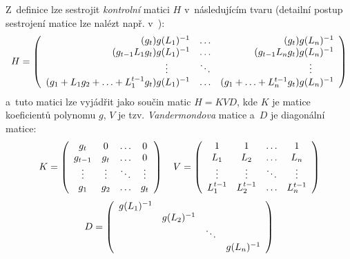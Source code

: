 \documentclass[thesis=M,czech,hidelinks]{FITthesis}[2012/06/26]
\newcommand{\0}{{\textcolor[gray]{0.75}{0}}}
\begin{document}
Z~definice lze sestrojit \emph{kontrolní} matici $H$ v~následujícím tvaru
(detailní postup sestrojení matice lze nalézt např. v~\cite{Kotil}):
$$
    H = \left(\begin{array}{r c r}
        (           g_t) g(L_1)^{-1} & \ldots & (           g_t) g(L_n)^{-1} \\
        (g_{t-1}L_1 g_t) g(L_1)^{-1} & \ldots & (g_{t-1}L_n g_t) g(L_n)^{-1} \\
        \vdots \qquad \;             & \ddots & \vdots \qquad \;             \\
        (g_1 + L_1 g_2 + \ldots + L_1^{t-1} g_t) g(L_1)^{-1} &
            \ldots  &
            (g_1 + \ldots + L_n^{t-1} g_t) g(L_n)^{-1} \\
    \end{array}\right)
$$
a~tuto matici lze vyjádřit jako součin matic $ H = KVD $, kde $K$ je matice
koeficientů polynomu $g$, $V$ je tzv. \emph{Vandermondova} matice a~$D$ je
diagonální matice:
$$
    K = \left(\begin{array}{c c c c}
        g_t     & 0      & \ldots & 0      \\
        g_{t-1} & g_t    & \ldots & 0      \\
        \vdots  & \vdots & \ddots & \vdots \\
        g_1     & g_2    & \ldots & g_t    \\
    \end{array}\right)
    \quad
    V = \left(\begin{array}{c c c c}
        1         & 1         & \ldots & 1         \\
        L_1       & L_2       & \ldots & L_n       \\
        \vdots    & \vdots    & \ddots & \vdots    \\
        L_1^{t-1} & L_2^{t-1} & \ldots & L_n^{t-1} \\
    \end{array}\right)
$$
$$
    D = \left(\begin{array}{c c c c}
        g(L_1)^{-1} &             &        &             \\
                    & g(L_2)^{-1} &        &             \\
                    &             & \ddots &             \\
                    &             &        & g(L_n)^{-1} \\
    \end{array}\right)
$$
\end{document}

